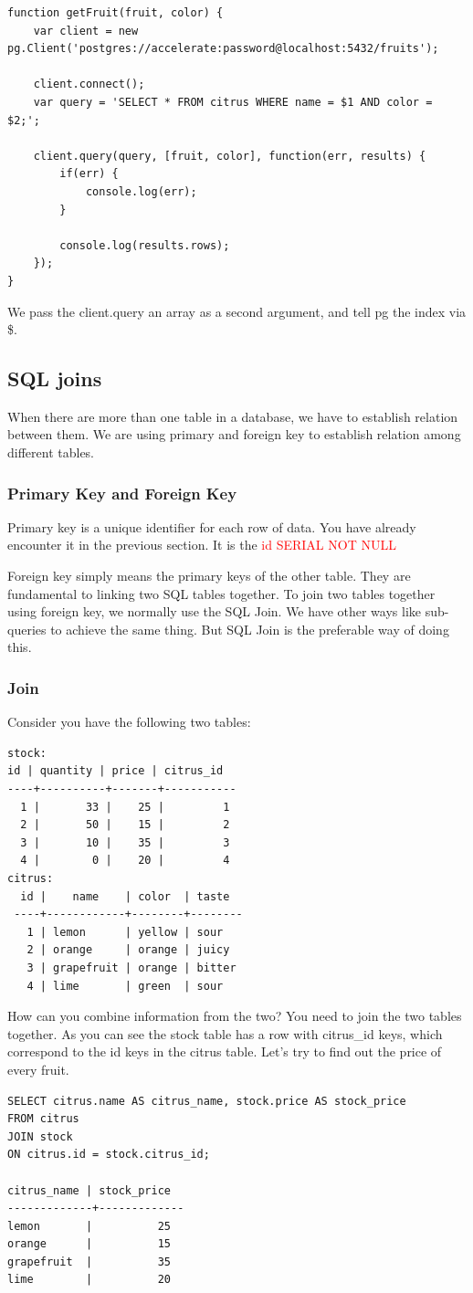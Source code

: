\documentclass[a4paper]{article}
\begin{document}
\begin{lstlisting}
function getFruit(fruit, color) {
    var client = new pg.Client('postgres://accelerate:password@localhost:5432/fruits');

    client.connect();
    var query = 'SELECT * FROM citrus WHERE name = $1 AND color = $2;';

    client.query(query, [fruit, color], function(err, results) {
        if(err) {
            console.log(err);
        }

        console.log(results.rows);
    });
}
\end{lstlisting}
We pass the client.query an array as a second argument, and tell pg the index via \$.


\subsection{SQL joins}
When there are more than one table in a database, we have to establish relation between them. We are using primary and foreign key to establish relation among different tables.
\subsubsection{Primary Key and Foreign Key}
Primary key is a unique identifier for each row of data. You have already encounter it in the previous section. It is the \textcolor{red}{id SERIAL NOT NULL}

Foreign key simply means the primary keys of the other table. They are fundamental to linking two SQL tables together. To join two tables together using foreign key, we normally use the SQL Join. We have other ways like sub-queries to achieve the same thing. But SQL Join is the preferable way of doing this.
\subsubsection{Join}
Consider you have the following two tables:
\begin{lstlisting}
stock:
id | quantity | price | citrus_id
----+----------+-------+-----------
  1 |       33 |    25 |         1
  2 |       50 |    15 |         2
  3 |       10 |    35 |         3
  4 |        0 |    20 |         4
citrus:
  id |    name    | color  | taste
 ----+------------+--------+--------
   1 | lemon      | yellow | sour
   2 | orange     | orange | juicy
   3 | grapefruit | orange | bitter
   4 | lime       | green  | sour
\end{lstlisting}
How can you combine information from the two? You need to join the two tables together. As you can see the stock table has a row with citrus\_id keys, which correspond to the id keys in the citrus table. Let’s try to find out the price of every fruit.
\begin{lstlisting}
SELECT citrus.name AS citrus_name, stock.price AS stock_price
FROM citrus
JOIN stock
ON citrus.id = stock.citrus_id;

citrus_name | stock_price
-------------+-------------
lemon       |          25
orange      |          15
grapefruit  |          35
lime        |          20
\end{lstlisting}
\end{document}
